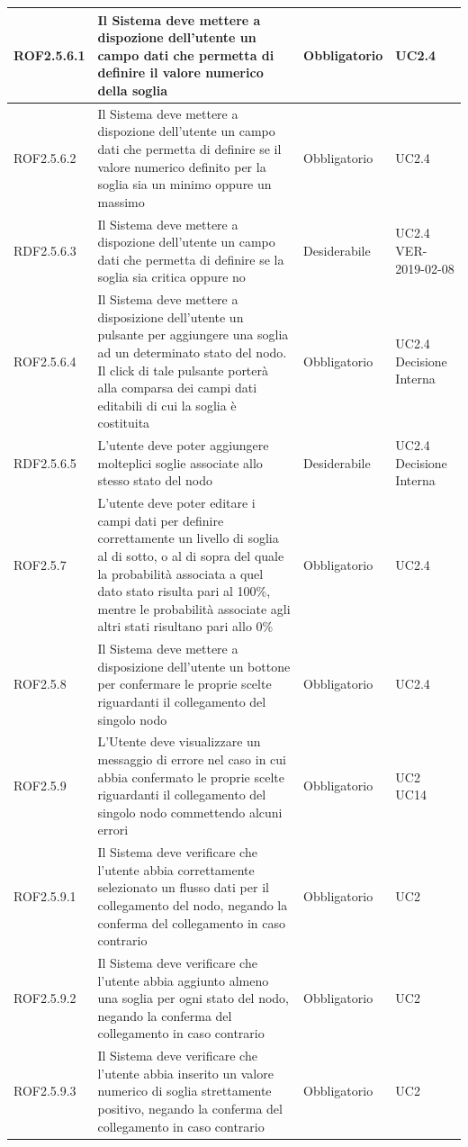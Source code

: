 \begin{center}
\begin{longtable}[c]{|m{}|m{}|m{}|m{}|}
\hline
ROF2.5.6.1 & Il Sistema deve mettere a dispozione dell'utente un campo dati che permetta di definire il valore numerico della soglia & Obbligatorio & UC2.4\\
\hline
\rowcolor{grigio}ROF2.5.6.2 & Il Sistema deve mettere a dispozione dell'utente un campo dati che permetta di definire se il valore numerico definito per la soglia sia un minimo oppure un massimo & Obbligatorio & UC2.4\\
\hline
RDF2.5.6.3 & Il Sistema deve mettere a dispozione dell'utente un campo dati che permetta di definire se la soglia sia critica oppure no & Desiderabile & UC2.4 VER-2019-02-08\\
\hline
ROF2.5.6.4 & Il Sistema deve mettere a disposizione dell'utente un pulsante per aggiungere una soglia ad un determinato stato del nodo. Il click di tale pulsante porterà alla comparsa dei campi dati editabili di cui la soglia è costituita & Obbligatorio & UC2.4 Decisione Interna\\
\hline
RDF2.5.6.5 & L'utente deve poter aggiungere molteplici soglie associate allo stesso stato del nodo & Desiderabile & UC2.4 Decisione Interna\\
\hline
\rowcolor{grigio}ROF2.5.7 & L'utente deve poter editare i campi dati per definire correttamente un livello di soglia al di sotto, o al di sopra del quale la probabilità associata a quel dato stato risulta pari al 100\%, mentre le probabilità associate agli altri stati risultano pari allo 0\% & Obbligatorio & UC2.4\\
\hline
ROF2.5.8 & Il Sistema deve mettere a disposizione dell'utente un bottone per confermare le proprie scelte riguardanti il collegamento del singolo nodo & Obbligatorio & UC2.4\\
\hline
\rowcolor{grigio}ROF2.5.9 & L'Utente deve visualizzare un messaggio di errore nel caso in cui abbia confermato le proprie scelte riguardanti il collegamento del singolo nodo commettendo alcuni errori & Obbligatorio & UC2 UC14\\
\hline
ROF2.5.9.1 & Il Sistema deve verificare che l'utente abbia correttamente selezionato un flusso dati per il collegamento del nodo, negando la conferma del collegamento in caso contrario & Obbligatorio & UC2\\
\hline
ROF2.5.9.2 & Il Sistema deve verificare che l'utente abbia aggiunto almeno una soglia per ogni stato del nodo, negando la conferma del collegamento in caso contrario & Obbligatorio & UC2\\
\hline
ROF2.5.9.3 & Il Sistema deve verificare che l'utente abbia inserito un valore numerico di soglia strettamente positivo, negando la conferma del collegamento in caso contrario & Obbligatorio & UC2\\

\end{longtable}
\end{center}
